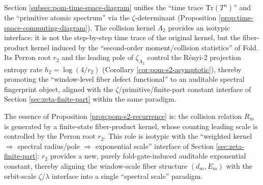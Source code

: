 

\begin{remark}\label{rem:pom-collision-diagram}
Section \ref{subsec:pom-time-space-diagram} unifies the ``time trace \(\mathrm{Tr}(T^n)\)'' and the ``primitive atomic spectrum'' via the \(\zeta\)-determinant (Proposition \ref{prop:time-space-commuting-diagram}). The collision kernel \(A_2\) provides an isotypic interface: it is not the step-by-step time trace of the original kernel, but the fiber-product kernel induced by the ``second-order moment/collision statistics'' of Fold. Its Perron root \(r_2\) and the leading pole of \(\zeta_{A_2}\) control the R\'enyi-2 projection entropy rate \(h_2=\log(4/r_2)\) (Corollary \ref{cor:pom-s2-asymptotic}), thereby promoting the ``window-level fiber defect functional'' to an auditable spectral fingerprint object, aligned with the \(\zeta\)/primitive/finite-part constant interface of Section \ref{sec:zeta-finite-part} within the same paradigm.
\end{remark}

\begin{remark}\label{rem:pom-s2-zeta}
The essence of Proposition \ref{prop:pom-s2-recurrence} is: the collision relation \(R_m\) is generated by a finite-state fiber-product kernel, whose counting leading scale is controlled by the Perron root \(r_2\). This role is isotypic with the ``weighted kernel \(\Rightarrow\) spectral radius/pole \(\Rightarrow\) exponential scale'' interface of Section \ref{sec:zeta-finite-part}: \(r_2\) provides a new, purely fold-gate-induced auditable exponential constant, thereby aligning the window-scale fiber structure \((d_m,E_m)\) with the orbit-scale \(\zeta/\lambda\) interface into a single ``spectral scale'' paradigm.
\end{remark}
